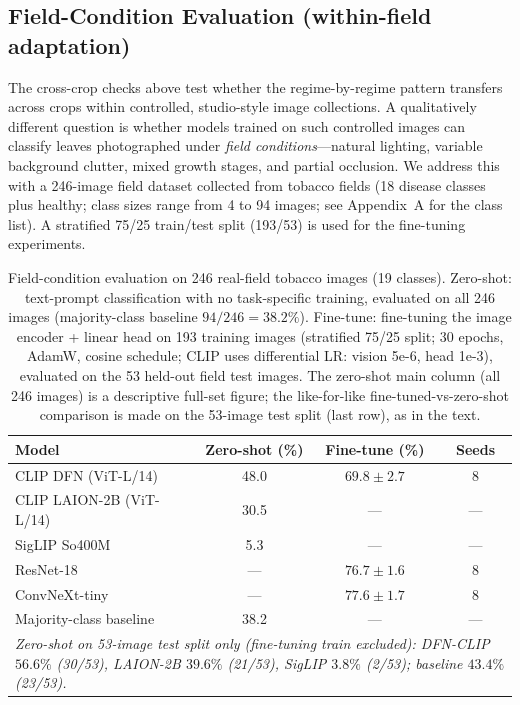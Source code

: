 \documentclass[10pt,a4paper]{article}
\begin{document}
\subsection{Field-Condition Evaluation (within-field adaptation)}
\label{sec:field}

The cross-crop checks above test whether the regime-by-regime pattern transfers across crops within controlled, studio-style image collections. A qualitatively different question is whether models trained on such controlled images can classify leaves photographed under \emph{field conditions}---natural lighting, variable background clutter, mixed growth stages, and partial occlusion. We address this with a 246-image field dataset collected from tobacco fields (18 disease classes plus healthy; class sizes range from 4 to 94 images; see Appendix~A for the class list). A stratified 75/25 train/test split (193/53) is used for the fine-tuning experiments.

\begin{table}[!ht]
\centering
\caption{Field-condition evaluation on 246 real-field tobacco images (19 classes). Zero-shot: text-prompt classification with no task-specific training, evaluated on all 246 images (majority-class baseline $94/246 = 38.2\%$). Fine-tune: fine-tuning the image encoder + linear head on 193 training images (stratified 75/25 split; 30 epochs, AdamW, cosine schedule; CLIP uses differential LR: vision 5e-6, head 1e-3), evaluated on the 53 held-out field test images. The zero-shot main column (all 246 images) is a descriptive full-set figure; the like-for-like fine-tuned-vs-zero-shot comparison is made on the 53-image test split (last row), as in the text.}
\label{tab:field}
\setlength{\tabcolsep}{6pt}
\begin{tabular}{lccc}
\toprule
\textbf{Model} & \textbf{Zero-shot (\%)} & \textbf{Fine-tune (\%)} & \textbf{Seeds} \\
\midrule
CLIP DFN (ViT-L/14) & 48.0 & $69.8\pm2.7$ & 8 \\
CLIP LAION-2B (ViT-L/14) & 30.5 & --- & --- \\
SigLIP So400M & 5.3 & --- & --- \\
\midrule
ResNet-18 & --- & $76.7\pm1.6$ & 8 \\
ConvNeXt-tiny & --- & $77.6\pm1.7$ & 8 \\
\midrule
Majority-class baseline & 38.2 & --- & --- \\
\midrule
\multicolumn{4}{p{\dimexpr\hsize-2\tabcolsep\relax}}{\small\emph{Zero-shot on 53-image test split only (fine-tuning train excluded): DFN-CLIP $56.6\%$ (30/53), LAION-2B $39.6\%$ (21/53), SigLIP $3.8\%$ (2/53); baseline $43.4\%$ (23/53).}} \\
\bottomrule
\end{tabular}
\end{table}
\end{document}
